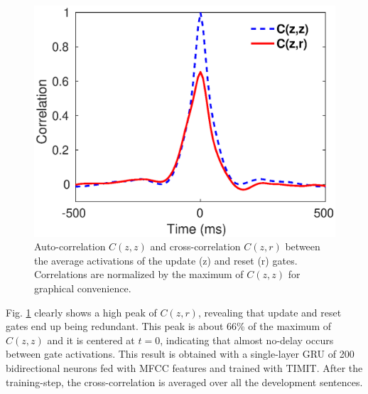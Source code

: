 \documentclass[journal]{IEEEtran}
\begin{document}
\begin{figure}[t]
\centering
  \includegraphics[scale=0.50]{corr_plot_BN.eps}
\caption{Auto-correlation $C(z,z)$ and cross-correlation $C(z,r)$ between the average activations of the update (z) and reset (r) gates. Correlations are normalized by the maximum of $C(z,z)$ for graphical convenience.}\label{fig:corr}
\end{figure}
Fig. \ref{fig:corr} clearly shows a high peak of $C(z,r)$, revealing that update and reset gates end up being  redundant. This peak is about 66\% of the maximum of $C(z,z)$ and it is centered at $t=0$, indicating that almost no-delay occurs between gate activations.  This result is obtained with a single-layer GRU of 200 bidirectional neurons fed with MFCC features and trained with TIMIT. After the training-step, the cross-correlation is averaged over all the development sentences.
\end{document}
